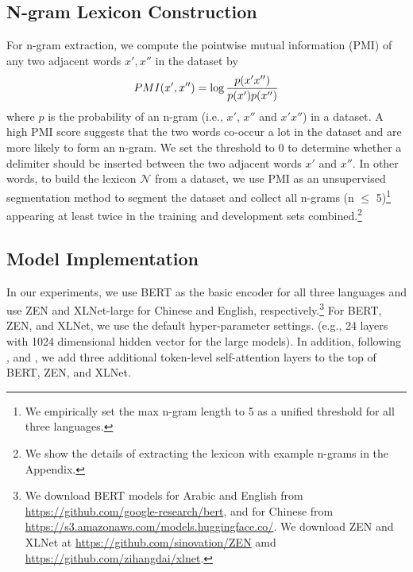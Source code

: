 \documentclass[11pt,a4paper]{article}
\begin{document}
\subsection{N-gram Lexicon Construction}

For n-gram extraction, 
we compute the pointwise mutual information (PMI) of any two adjacent words
$x', x''$ in the dataset by
\begin{equation}
\setlength\abovedisplayskip{5pt}
\setlength\belowdisplayskip{5pt}
    PMI(x', x'') = \log \frac{p(x'x'')}{p(x')p(x'')}
\end{equation}
where $p$ is the probability of an n-gram (i.e., $x'$, $x''$ and $x'x''$) in a dataset. 
A high PMI score suggests that the two words co-occur a lot in the dataset and are more likely to form an n-gram.
We set the threshold to 0 to determine whether a delimiter should be inserted between the two adjacent words $x'$ and $x''$.
In other words, to build the lexicon $\mathcal{N}$ from a dataset, we use PMI as an unsupervised segmentation method
to segment the dataset and collect all n-grams (n $\leq$ 5)\footnote{We empirically set the max n-gram length to 5 as a unified threshold for all three languages.} appearing at least twice in the training and development sets combined.\footnote{We show the details of extracting the lexicon with example n-grams in the Appendix.}


\subsection{Model Implementation}

In our experiments, we use BERT \cite{devlin-etal-2019-bert} as the basic encoder for all three languages 
and use ZEN \cite{Sinovation2019ZEN} and XLNet-large \cite{yang-2019-xlnet} for Chinese and English, respectively.\footnote{We download BERT models for Arabic and English from \url{https://github.com/google-research/bert}, and for Chinese from \url{https://s3.amazonaws.com/models.huggingface.co/}.
We download ZEN and XLNet at \url{https://github.com/sinovation/ZEN}
amd \url{https://github.com/zihangdai/xlnet}.}
For BERT, ZEN, and XLNet, we use the default hyper-parameter settings.
(e.g., 
24 layers with 1024 dimensional hidden vector for the large models).
In addition, following 
, 
 and , we add three
additional token-level self-attention layers to the top of BERT, ZEN, and XLNet.
\end{document}
